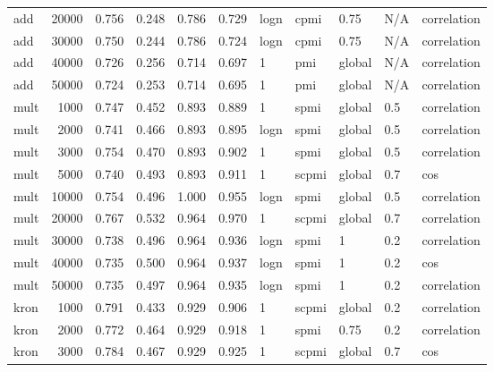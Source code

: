 \begin{tabular}{lrrrrrlllll}
     add &           20000 &  0.756 &  0.248 &      0.786 &          0.729 &  logn &   cpmi &    0.75 &  N/A &    correlation \\
     add &           30000 &  0.750 &  0.244 &      0.786 &          0.724 &  logn &   cpmi &    0.75 &  N/A &    correlation \\
     add &           40000 &  0.726 &  0.256 &      0.714 &          0.697 &     1 &    pmi &  global &  N/A &    correlation \\
     add &           50000 &  0.724 &  0.253 &      0.714 &          0.695 &     1 &    pmi &  global &  N/A &    correlation \\
    mult &            1000 &  0.747 &  0.452 &      0.893 &          0.889 &     1 &   spmi &  global &  0.5 &    correlation \\
    mult &            2000 &  0.741 &  0.466 &      0.893 &          0.895 &  logn &   spmi &  global &  0.5 &    correlation \\
    mult &            3000 &  0.754 &  0.470 &      0.893 &          0.902 &     1 &   spmi &  global &  0.5 &    correlation \\
    mult &            5000 &  0.740 &  0.493 &      0.893 &          0.911 &     1 &  scpmi &  global &  0.7 &            cos \\
    mult &           10000 &  0.754 &  0.496 &      1.000 &          0.955 &  logn &   spmi &  global &  0.5 &    correlation \\
    mult &           20000 &  0.767 &  0.532 &      0.964 &          0.970 &     1 &  scpmi &  global &  0.7 &    correlation \\
    mult &           30000 &  0.738 &  0.496 &      0.964 &          0.936 &  logn &   spmi &       1 &  0.2 &    correlation \\
    mult &           40000 &  0.735 &  0.500 &      0.964 &          0.937 &  logn &   spmi &       1 &  0.2 &            cos \\
    mult &           50000 &  0.735 &  0.497 &      0.964 &          0.935 &  logn &   spmi &       1 &  0.2 &    correlation \\
    kron &            1000 &  0.791 &  0.433 &      0.929 &          0.906 &     1 &  scpmi &  global &  0.2 &    correlation \\
    kron &            2000 &  0.772 &  0.464 &      0.929 &          0.918 &     1 &   spmi &    0.75 &  0.2 &    correlation \\
    kron &            3000 &  0.784 &  0.467 &      0.929 &          0.925 &     1 &  scpmi &  global &  0.7 &            cos \\

\end{tabular}
